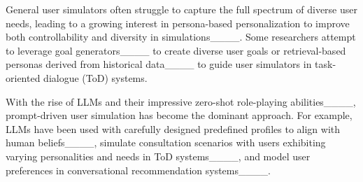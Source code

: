 General user simulators often struggle to capture the full spectrum of diverse user needs, leading to a growing interest in persona-based personalization to improve both controllability and diversity in simulations____. Some researchers attempt to leverage goal generators____ to create diverse user goals or retrieval-based personas derived from historical data____ to guide user simulators in task-oriented dialogue (ToD) systems.

With the rise of LLMs and their impressive zero-shot role-playing abilities____, prompt-driven user simulation has become the dominant approach. For example, LLMs have been used with carefully designed predefined profiles to align with human beliefs____, simulate consultation scenarios with users exhibiting varying personalities and needs in ToD systems____, and model user preferences in conversational recommendation systems____.






